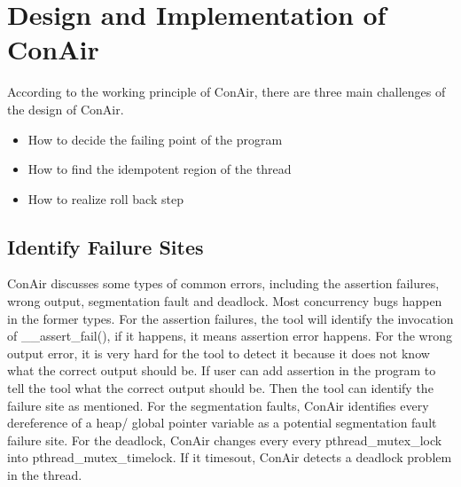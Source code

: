 \chapter{Design and Implementation of ConAir}
\label{chp:Design}
According to the working principle of ConAir, there are three main challenges of the design of ConAir. 
\begin{itemize}
\item
How to decide the failing point of the program
\item
How to find the idempotent region of the thread
\item
How to realize roll back step
\end{itemize}
\section{Identify Failure Sites}
ConAir discusses some types of common errors, including the assertion failures, wrong output, segmentation fault and deadlock. Most concurrency bugs happen in the former types. For the assertion failures, the tool will identify the invocation of \_\_assert\_fail(), if it happens, it means assertion error happens. For the wrong output error, it is very hard for the tool to detect it because it does not know what the correct output should be. If user can add assertion in the program to tell the tool what the correct output should be. Then the tool can identify the failure site as mentioned. For the segmentation faults, ConAir identifies every dereference of a heap/ global pointer variable as a  potential segmentation fault failure site. For the deadlock, ConAir changes every every pthread\_mutex\_lock into pthread\_mutex\_timelock. If it timesout, ConAir detects a deadlock problem in the thread.
